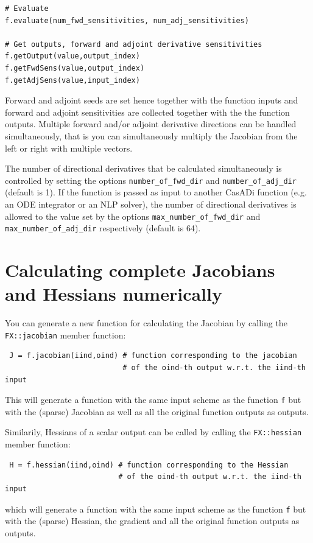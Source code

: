 \documentclass[a4paper,12pt]{book}
\begin{document}
{\begin{verbatim}
# Evaluate
f.evaluate(num_fwd_sensitivities, num_adj_sensitivities)

# Get outputs, forward and adjoint derivative sensitivities
f.getOutput(value,output_index)
f.getFwdSens(value,output_index)
f.getAdjSens(value,input_index)
\end{verbatim}

Forward and adjoint seeds are set hence together with the function inputs and forward and adjoint sensitivities are collected together with the the function outputs. Multiple forward and/or adjoint derivative directions can be handled simultaneously, that is you can simultaneously multiply the Jacobian from the left or right with multiple vectors.

The number of directional derivatives that be calculated simultaneously is controlled by setting the options \verb|number_of_fwd_dir| and \verb|number_of_adj_dir| (default is 1). If the function is passed as input to another CasADi function (e.g. an ODE integrator or an NLP solver), the number of directional derivatives is allowed to the value set by the options \verb|max_number_of_fwd_dir| and \verb|max_number_of_adj_dir| respectively (default is 64).

\section{Calculating complete Jacobians and Hessians numerically}
You can generate a new function for calculating the Jacobian by calling the \texttt{FX::jacobian} member function:
\begin{verbatim}
 J = f.jacobian(iind,oind) # function corresponding to the jacobian
                           # of the oind-th output w.r.t. the iind-th input
\end{verbatim}
This will generate a function with the same input scheme as the function \texttt{f} but with the (sparse) Jacobian as well as all the original function outputs as outputs.

Similarily, Hessians of a scalar output can be called by calling the \texttt{FX::hessian} member function:
\begin{verbatim}
 H = f.hessian(iind,oind) # function corresponding to the Hessian
                          # of the oind-th output w.r.t. the iind-th input
\end{verbatim}
which will generate a function with the same input scheme as the function \texttt{f} but with the (sparse) Hessian, the gradient and all the original function outputs as outputs.

}
\end{document}

